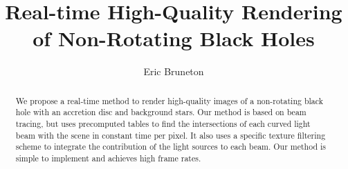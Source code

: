 \documentclass{document}
\title[Real-time High-Quality Rendering of Non-Rotating Black Holes]%
      {Real-time High-Quality Rendering of Non-Rotating Black Holes}
\author[E. Bruneton]{\parbox{\textwidth}{\centering Eric Bruneton}}
\begin{document}


\maketitle

\begin{abstract}
We propose a real-time method to render high-quality images of a non-rotating 
black hole with an accretion disc and background stars. Our method is based on 
beam tracing, but uses precomputed tables to find the intersections of each
curved light beam with the scene in constant time per pixel. It also uses a 
specific texture filtering scheme to integrate the contribution of the light 
sources to each beam. Our method is simple to implement and achieves high frame 
rates.
\end{abstract}  
\end{document}
